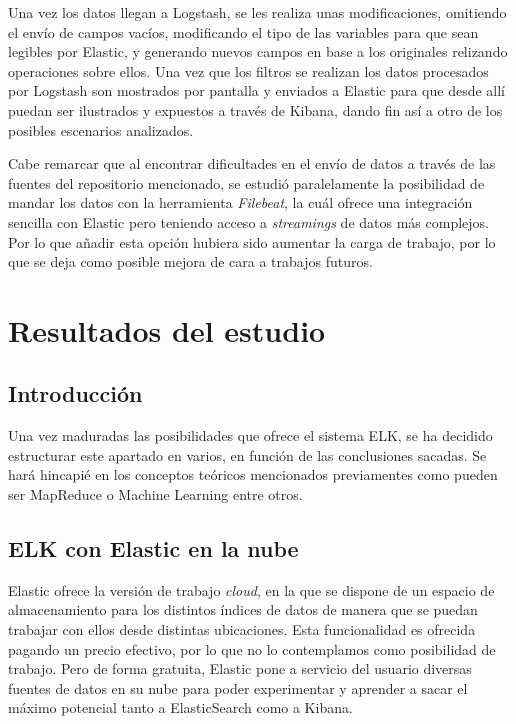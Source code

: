 Una vez los datos llegan a Logstash, se les realiza unas modificaciones, omitiendo el envío de campos vacíos, modificando el tipo de las variables para que sean legibles por Elastic, y generando nuevos campos en base a los originales relizando operaciones sobre ellos. Una vez que los filtros se realizan los datos procesados por Logstash son mostrados por pantalla y enviados a Elastic para que desde allí puedan ser ilustrados y expuestos a través de Kibana, dando fin así a otro de los posibles escenarios analizados.

Cabe remarcar que al encontrar dificultades en el envío de datos a través de las fuentes del repositorio mencionado, se estudió paralelamente la posibilidad de mandar los datos con la herramienta \textit{Filebeat}, la cuál ofrece una integración sencilla con Elastic pero teniendo acceso a \textit{streamings} de datos más complejos. Por lo que añadir esta opción hubiera sido aumentar la carga de trabajo, por lo que se deja como posible mejora de cara a trabajos futuros.

\section{Resultados del estudio}

\subsection{Introducción}
Una vez maduradas las posibilidades que ofrece el sistema ELK, se ha decidido estructurar este apartado en varios, en función de las conclusiones sacadas. Se hará hincapié en los conceptos teóricos mencionados previamentes como pueden ser MapReduce o Machine Learning entre otros.

\subsection{ELK con Elastic en la nube}

Elastic ofrece la versión de trabajo \textit{cloud}, en la que se dispone de un espacio de almacenamiento para los distintos índices de datos de manera que se puedan trabajar con ellos desde distintas ubicaciones. Esta funcionalidad es ofrecida pagando un precio efectivo, por lo que no lo contemplamos como posibilidad de trabajo. Pero de forma gratuita, Elastic pone a servicio del usuario diversas fuentes de datos en su nube para poder experimentar y aprender a sacar el máximo potencial tanto a ElasticSearch como a Kibana.


